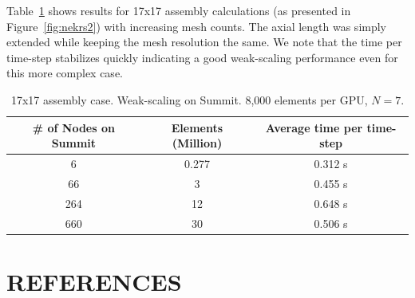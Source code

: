 \documentclass[11pt,letterpaper,english]{article}
\begin{document}
Table~\ref{wscaling2} shows results for 17x17 assembly calculations (as presented in Figure~\ref{fig:nekrs2}) with increasing mesh counts. The axial length was simply extended while keeping the mesh resolution the same. We note that the time per time-step stabilizes quickly indicating a good weak-scaling performance even for this more complex case.

\begin{table} [!h]
\begin{center} \begin{tabular}{ccc}
 \hline
\# of Nodes on Summit & Elements (Million) &  Average time per time-step \\
 \hline
6	  & 0.277	& 0.312 s \\
66    & 3  	    & 0.455 s \\
264   & 12	    & 0.648 s \\
660   & 30	    & 0.506 s \\
\hline
\end{tabular} \end{center}
\caption{\label{wscaling2} 17x17 assembly case. Weak-scaling on Summit. 8,000 elements per GPU, $N=7$.}
\end{table}



\vspace{-.15in}
\section{REFERENCES}
\vspace{-.15in}



\renewcommand{\section}[2]{}%




\end{document}
